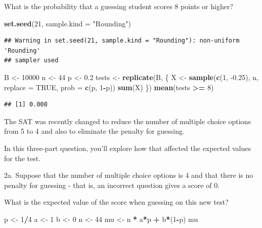 \documentclass[
]{article}
\newenvironment{Shaded}{\begin{snugshade}}{\end{snugshade}}
\newcommand{\DataTypeTok}[1]{\textcolor[rgb]{0.13,0.29,0.53}{#1}}
\newcommand{\DecValTok}[1]{\textcolor[rgb]{0.00,0.00,0.81}{#1}}
\newcommand{\FloatTok}[1]{\textcolor[rgb]{0.00,0.00,0.81}{#1}}
\newcommand{\KeywordTok}[1]{\textcolor[rgb]{0.13,0.29,0.53}{\textbf{#1}}}
\newcommand{\NormalTok}[1]{#1}
\newcommand{\OperatorTok}[1]{\textcolor[rgb]{0.81,0.36,0.00}{\textbf{#1}}}
\newcommand{\OtherTok}[1]{\textcolor[rgb]{0.56,0.35,0.01}{#1}}
\newcommand{\StringTok}[1]{\textcolor[rgb]{0.31,0.60,0.02}{#1}}
\begin{document}
What is the probability that a guessing student scores 8 points or
higher?

\begin{Shaded}
\begin{Highlighting}[]
\KeywordTok{set.seed}\NormalTok{(}\DecValTok{21}\NormalTok{, }\DataTypeTok{sample.kind =} \StringTok{"Rounding"}\NormalTok{)}
\end{Highlighting}
\end{Shaded}

\begin{verbatim}
## Warning in set.seed(21, sample.kind = "Rounding"): non-uniform 'Rounding'
## sampler used
\end{verbatim}

\begin{Shaded}
\begin{Highlighting}[]
\NormalTok{B \textless{}{-}}\StringTok{ }\DecValTok{10000}
\NormalTok{n \textless{}{-}}\StringTok{ }\DecValTok{44}
\NormalTok{p \textless{}{-}}\StringTok{ }\FloatTok{0.2}
\NormalTok{tests \textless{}{-}}\StringTok{ }\KeywordTok{replicate}\NormalTok{(B, \{}
\NormalTok{  X \textless{}{-}}\StringTok{ }\KeywordTok{sample}\NormalTok{(}\KeywordTok{c}\NormalTok{(}\DecValTok{1}\NormalTok{, }\FloatTok{{-}0.25}\NormalTok{), n, }\DataTypeTok{replace =} \OtherTok{TRUE}\NormalTok{, }\DataTypeTok{prob =} \KeywordTok{c}\NormalTok{(p, }\DecValTok{1}\OperatorTok{{-}}\NormalTok{p))}
  \KeywordTok{sum}\NormalTok{(X)}
\NormalTok{\})}
\KeywordTok{mean}\NormalTok{(tests }\OperatorTok{\textgreater{}=}\StringTok{ }\DecValTok{8}\NormalTok{)}
\end{Highlighting}
\end{Shaded}

\begin{verbatim}
## [1] 0.008
\end{verbatim}

The SAT was recently changed to reduce the number of multiple choice
options from 5 to 4 and also to eliminate the penalty for guessing.

In this three-part question, you'll explore how that affected the
expected values for the test.

2a. Suppose that the number of multiple choice options is 4 and that
there is no penalty for guessing - that is, an incorrect question gives
a score of 0.

What is the expected value of the score when guessing on this new test?

\begin{Shaded}
\begin{Highlighting}[]
\NormalTok{p \textless{}{-}}\StringTok{ }\DecValTok{1}\OperatorTok{/}\DecValTok{4}
\NormalTok{a \textless{}{-}}\StringTok{ }\DecValTok{1}
\NormalTok{b \textless{}{-}}\StringTok{ }\DecValTok{0}
\NormalTok{n \textless{}{-}}\StringTok{ }\DecValTok{44}
\NormalTok{mu \textless{}{-}}\StringTok{ }\NormalTok{n }\OperatorTok{*}\StringTok{ }\NormalTok{a}\OperatorTok{*}\NormalTok{p }\OperatorTok{+}\StringTok{ }\NormalTok{b}\OperatorTok{*}\NormalTok{(}\DecValTok{1}\OperatorTok{{-}}\NormalTok{p)}
\NormalTok{mu}
\end{Highlighting}
\end{Shaded}
\end{document}
